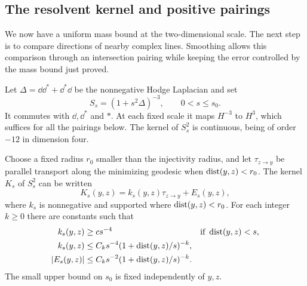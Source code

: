 \subsection{The resolvent kernel and positive pairings}

We now have a uniform mass bound at the two-dimensional scale. The
next step is to compare directions of nearby complex lines. Smoothing
allows this comparison through an intersection pairing while keeping
the error controlled by the mass bound just proved.

Let $\Delta=\dd\dd^*+\dd^*\dd$ be the nonnegative Hodge Laplacian and
set
\begin{equation}\label{eq:current-smoothing}
 S_s=(1+s^2\Delta)^{-3},\qquad 0<s\le s_0.
\end{equation}
It commutes with $\dd,\dd^*$ and $*$.  At each fixed scale it maps
$H^{-3}$ to $H^3$, which suffices for all the pairings below.  The kernel
of $S_s^2$ is continuous, being of order $-12$ in dimension four.

\begin{lemma}\label{lem:current-kernel}
Choose a fixed radius $r_0$ smaller than the injectivity radius, and let
$\tau_{z\to y}$ be parallel transport along the minimizing geodesic
when $\operatorname{dist}(y,z)<r_0$.  The kernel $K_s$ of $S_s^2$ can be written
\begin{equation}\label{eq:current-kernel-split}
 K_s(y,z)=k_s(y,z)\tau_{z\to y}+E_s(y,z),
\end{equation}
where $k_s$ is nonnegative and supported where $\operatorname{dist}(y,z)<r_0$.
For each integer $k\ge0$ there are constants such that
\begin{align}
 k_s(y,z)&\ge cs^{-4}&&\text{if }\operatorname{dist}(y,z)<s,
                         \label{eq:current-kernel-lower}\\
 k_s(y,z)&\le C_ks^{-4}(1+\operatorname{dist}(y,z)/s)^{-k},
                         \label{eq:current-kernel-upper}\\
 |E_s(y,z)|&\le C_ks^{-2}(1+\operatorname{dist}(y,z)/s)^{-k}.
                         \label{eq:current-kernel-error}
\end{align}
The small upper bound on $s_0$ is fixed independently of $y,z$.
\end{lemma}

